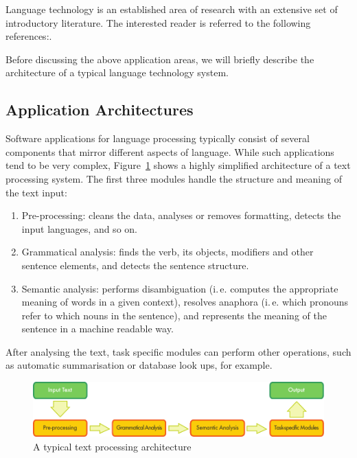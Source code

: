 \begin{multicols}{2}
Language technology is an established area of research with an extensive set of introductory literature. The interested reader is referred to the following references:\cite{carstensen-etal1, jurafsky-martin01, manning-schuetze1, lt-world1, lt-survey1}.

Before discussing the above application areas, we will briefly describe the architecture of a typical language technology system.

\subsection{Application Architectures}

Software applications for language processing typically consist of several components that mirror different aspects of language. 
While such applications tend to be very complex, Figure~\ref{fig:textprocessingarch_en} shows a highly simplified architecture of a text processing system. The first three modules handle the structure and meaning of the text input:

\begin{enumerate}
\item Pre-processing: cleans the data, analyses or removes formatting, detects the input languages, and so on.
\item Grammatical analysis: finds the verb, its objects, modifiers and other sentence elements, and detects the sentence structure.
\item Semantic analysis: performs disambiguation (i.\,e. computes the appropriate meaning of words in a given context), resolves anaphora (i.\,e. which pronouns refer to which nouns in the sentence), and represents the meaning of the sentence in a machine readable way.
\end{enumerate}

After analysing the text, task specific modules can perform other operations, such as automatic summarisation or database look ups, for example.


\begin{figure}[htb]
  \center
  \includegraphics[width=\textwidth]{../_media/english/text_processing_app_architecture}
  \caption{A typical text processing architecture}
  \label{fig:textprocessingarch_en}
\end{figure}


\end{multicols}
